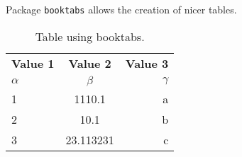 \lipsum[40]

Package \texttt{booktabs} allows the creation of nicer tables.

\begin{table}[h!]
  \begin{center}
    \caption{Table using booktabs.}
    \label{tab:table1}
    \begin{tabular}{l|c|r}
      \toprule %
      \textbf{Value 1} & \textbf{Value 2} & \textbf{Value 3}\\
      $\alpha$ & $\beta$ & $\gamma$ \\
      \midrule %
      1 & 1110.1 & a\\
      2 & 10.1 & b\\
      3 & 23.113231 & c\\
      \bottomrule %
    \end{tabular}
  \end{center}
\end{table}

\lipsum[41]